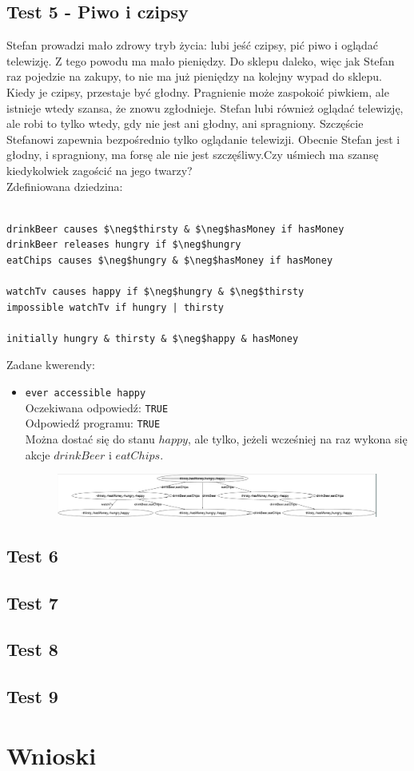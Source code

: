 \documentclass{article}
\begin{document}
\subsection{Test 5 - Piwo i czipsy}
Stefan prowadzi mało zdrowy tryb życia: lubi jeść czipsy, pić piwo i oglądać telewizję. Z tego powodu ma mało pieniędzy. Do sklepu daleko, więc jak Stefan raz pojedzie na zakupy, to nie ma już pieniędzy na kolejny wypad do sklepu. Kiedy je czipsy, przestaje być głodny. Pragnienie może zaspokoić piwkiem, ale istnieje wtedy szansa, że znowu zgłodnieje. Stefan lubi również oglądać telewizję, ale robi to tylko wtedy, gdy nie jest ani głodny, ani spragniony. Szczęście Stefanowi zapewnia bezpośrednio tylko oglądanie telewizji. Obecnie Stefan jest i głodny, i spragniony, ma forsę ale nie jest szczęśliwy.Czy uśmiech ma szansę kiedykolwiek zagościć na jego twarzy?\\
Zdefiniowana dziedzina:
\bigskip
{}
\begin{lstlisting}[mathescape=true]

drinkBeer causes $\neg$thirsty & $\neg$hasMoney if hasMoney
drinkBeer releases hungry if $\neg$hungry
eatChips causes $\neg$hungry & $\neg$hasMoney if hasMoney

watchTv causes happy if $\neg$hungry & $\neg$thirsty
impossible watchTv if hungry | thirsty

initially hungry & thirsty & $\neg$happy & hasMoney
\end{lstlisting}
\vspace{1cm}
Zadane kwerendy:
\begin{itemize}
	\item {\large\texttt{ever accessible happy}}\\
	Oczekiwana odpowiedź: \texttt{TRUE}\\
	Odpowiedź programu: \texttt{TRUE}\\
	Można dostać się do stanu $happy$, ale tylko, jeżeli wcześniej na raz wykona się akcje $drinkBeer$ i $eatChips$.
	\begin{figure}[H]
		\centering
		\includegraphics[scale=0.3]{stefan1}
	\end{figure}
\end{itemize}

\newpage
\subsection{Test 6}
\newpage
\subsection{Test 7}
\newpage
\subsection{Test 8}
\newpage
\subsection{Test 9}
\newpage
\section{Wnioski}
\end{document}
